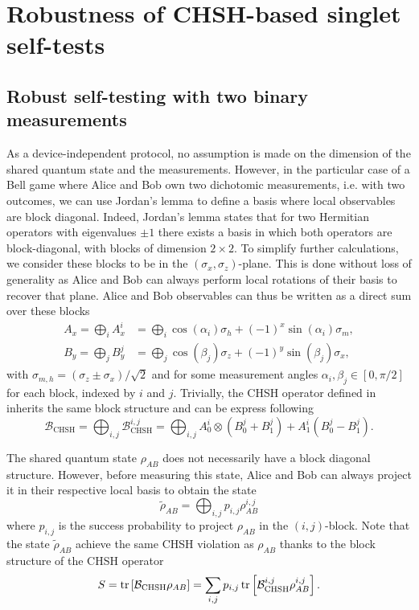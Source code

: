 \section{Robustness of CHSH-based singlet self-tests}

\subsection{Robust self-testing with two binary measurements}

As a device-independent protocol, no assumption is made on the dimension of the shared quantum state and the measurements.
However, in the particular case of a Bell game where Alice and Bob own two dichotomic measurements, i.e. with two outcomes, we can use Jordan's lemma to define a basis where local observables are block diagonal.
Indeed, Jordan's lemma states that for two Hermitian operators with eigenvalues $\pm1$ there exists a basis in which both operators are block-diagonal, with blocks of dimension $2 \times 2$.
To simplify further calculations, we consider these blocks to be in the $(\sigma_x,\sigma_z)$-plane.
This is done without loss of generality as Alice and Bob can always perform local rotations of their basis to recover that plane.
Alice and Bob observables can thus be written as a direct sum over these blocks 
\begin{equation}
	\begin{split}
	A_x = \bigoplus_i A_x^i &= \bigoplus_i \cos(\alpha_i)\sigma_h + (-1)^x \sin(\alpha_i)\sigma_m, \\
	B_y = \bigoplus_j B_y^j &= \bigoplus_j \cos(\beta_j)\sigma_z + (-1)^y \sin(\beta_j)\sigma_x,
	\end{split}
	\label{eq:block_observables}
\end{equation}
with $\sigma_{m,h} = (\sigma_z \pm \sigma_x)/\sqrt{2}$ and for some measurement angles $\alpha_i,\beta_j\in[0,\pi/2]$ for each block, indexed by $i$ and $j$.
Trivially, the CHSH operator defined in  inherits the same block structure and can be express following
\begin{equation}
	\mathcal{B}_\text{CHSH} = \bigoplus_{i,j} \mathcal{B}_\text{CHSH}^{i,j} = \bigoplus_{i,j} A_0^i \otimes (B_0^j + B_1^j) + A_1^i (B_0^j - B_1^j).
	\label{eq:block_operator}
\end{equation}

The shared quantum state $\rho_{AB}$ does not necessarily have a block diagonal structure. 
However, before measuring this state, Alice and Bob can always project it in their respective local basis to obtain the state
\begin{equation}
	\tilde{\rho}_{AB} = \bigoplus_{i,j} p_{i,j}\rho_{AB}^{i,j}
\end{equation}
where $p_{i,j}$ is the success probability to project $\rho_{AB}$ in the $(i,j)$-block.
Note that the state $\tilde{\rho}_{AB}$ achieve the same CHSH violation as $\rho_{AB}$ thanks to the block structure of the CHSH operator
\begin{equation}
	S = \trr{\mathcal{B}_\text{CHSH}\rho_{AB}} = \sum_{i,j} p_{i,j} \trr{\mathcal{B}_\text{CHSH}^{i,j}\rho_{AB}^{i,j}}.
\end{equation}

